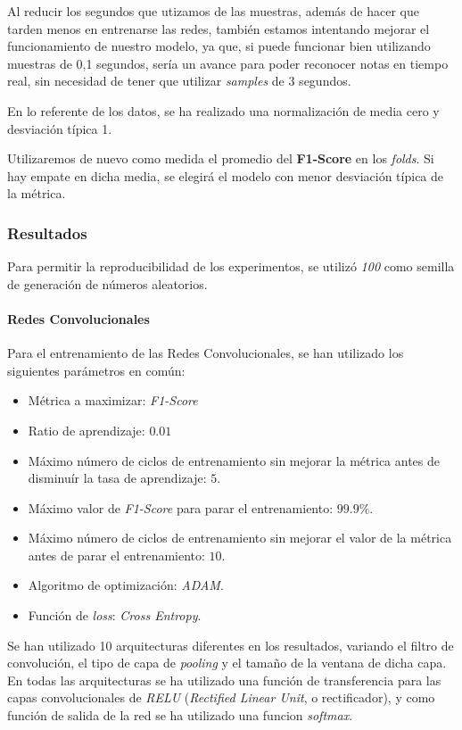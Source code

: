 \documentclass[12pt]{article}
\begin{document}
\bigskip
Al reducir los segundos que utizamos de las muestras, además de hacer que tarden menos en entrenarse las redes,
también estamos intentando mejorar el funcionamiento de nuestro modelo, ya que, si puede funcionar bien
utilizando muestras de 0,1 segundos, sería un avance para poder reconocer notas en tiempo real, sin necesidad
de tener que utilizar \textit{samples} de 3 segundos.

\bigskip
En lo referente de los datos, se ha realizado una normalización de media cero y desviación típica 1.

\bigskip
Utilizaremos de nuevo como medida el promedio del \textbf{F1-Score} en los \textit{folds}. Si hay empate en dicha media, se elegirá el modelo con menor
desviación típica de la métrica.

\subsubsection{Resultados}
Para permitir la reproducibilidad de los experimentos, se utilizó \textit{100} como semilla de generación de números
aleatorios.

\paragraph{Redes Convolucionales}

Para el entrenamiento de las Redes Convolucionales, se han utilizado los siguientes parámetros en común:
\begin{itemize}
	\item Métrica a maximizar: \textit{F1-Score} 
	\item Ratio de aprendizaje: $0.01$
	\item Máximo número de ciclos de entrenamiento sin mejorar la métrica antes de disminuír la tasa de aprendizaje: $5$.
	\item Máximo valor de \textit{F1-Score} para parar el entrenamiento: $99.9\%$.
	\item Máximo número de ciclos de entrenamiento sin mejorar el valor de la métrica antes de parar el entrenamiento: $10$.
	\item Algoritmo de optimización: \textit{ADAM}.
	\item Función de \textit{loss}: \textit{Cross Entropy}.
\end{itemize}

\bigskip
Se han utilizado 10 arquitecturas diferentes en los resultados, variando el filtro
de convolución, el tipo de capa de \textit{pooling} y el tamaño de la ventana de dicha capa. 
En todas las arquitecturas se ha utilizado una función de transferencia
para las capas convolucionales de \textit{RELU} (\textit{Rectified Linear Unit}, o rectificador), y
como función de salida de la red se ha utilizado una funcion \textit{softmax}.
\end{document}

